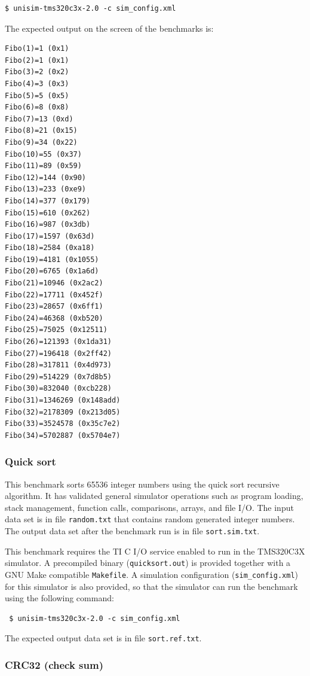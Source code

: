 \begin{verbatim}
$ unisim-tms320c3x-2.0 -c sim_config.xml
\end{verbatim}

\noindent The expected output on the screen of the benchmarks is:

\begin{verbatim}
Fibo(1)=1 (0x1)
Fibo(2)=1 (0x1)
Fibo(3)=2 (0x2)
Fibo(4)=3 (0x3)
Fibo(5)=5 (0x5)
Fibo(6)=8 (0x8)
Fibo(7)=13 (0xd)
Fibo(8)=21 (0x15)
Fibo(9)=34 (0x22)
Fibo(10)=55 (0x37)
Fibo(11)=89 (0x59)
Fibo(12)=144 (0x90)
Fibo(13)=233 (0xe9)
Fibo(14)=377 (0x179)
Fibo(15)=610 (0x262)
Fibo(16)=987 (0x3db)
Fibo(17)=1597 (0x63d)
Fibo(18)=2584 (0xa18)
Fibo(19)=4181 (0x1055)
Fibo(20)=6765 (0x1a6d)
Fibo(21)=10946 (0x2ac2)
Fibo(22)=17711 (0x452f)
Fibo(23)=28657 (0x6ff1)
Fibo(24)=46368 (0xb520)
Fibo(25)=75025 (0x12511)
Fibo(26)=121393 (0x1da31)
Fibo(27)=196418 (0x2ff42)
Fibo(28)=317811 (0x4d973)
Fibo(29)=514229 (0x7d8b5)
Fibo(30)=832040 (0xcb228)
Fibo(31)=1346269 (0x148add)
Fibo(32)=2178309 (0x213d05)
Fibo(33)=3524578 (0x35c7e2)
Fibo(34)=5702887 (0x5704e7)
\end{verbatim}

\subsubsection{Quick sort}

This benchmark sorts 65536 integer numbers using the quick sort recursive algorithm.
It has validated general simulator operations such as program loading, stack management, function calls, comparisons, arrays, and file I/O.
The input data set is in file \texttt{random.txt} that contains random generated integer numbers.
The output data set after the benchmark run is in file \texttt{sort.sim.txt}.

This benchmark requires the TI C I/O service enabled to run in the TMS320C3X simulator.
A precompiled binary (\texttt{quicksort.out}) is provided together with a GNU Make compatible \texttt{Makefile}.
A simulation configuration (\texttt{sim\_config.xml}) for this simulator is also provided, so that the simulator can run the benchmark using the following command:

\begin{verbatim}
 $ unisim-tms320c3x-2.0 -c sim_config.xml
\end{verbatim}

\noindent The expected output data set is in file \texttt{sort.ref.txt}.

\subsubsection{CRC32 (check sum)}

